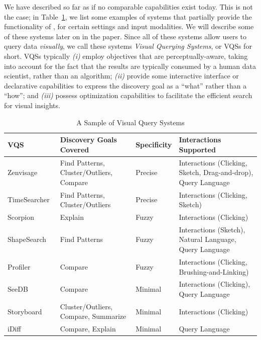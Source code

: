 \par
{}
We have described \vida so far as if no comparable capabilities
exist today.
This is not the case; in Table~\ref{fig:table}, we list some examples of systems
that partially provide the functionality of \vida,
for certain settings and input modalities.
We will describe some of these systems later on in the paper. 
Since all of these systems allow users to query data {\em visually},
we call these systems {\em Visual Querying Systems}, or VQSs for short.
VQSs typically {\em (i)} 
employ objectives that are perceptually-aware,
taking into account for the fact that the results are typically
consumed by a human data scientist, rather than an algorithm;
{\em (ii)} 
provide some interactive interface or declarative capabilities
to express the discovery goal as a ``what'' rather than a ``how'';
and
{\em (iii)}
possess optimization capabilities to facilitate
the efficient search for visual insights. 


\begin{table}[!t]
\scriptsize
\centering
\begin{tabular}{l|l|l|p{7.5cm}}
VQS & Discovery Goals Covered & Specificity & Interactions Supported \\ \hline

Zenvisage~\cite{Lee2017,Siddiqui2016} & Find Patterns, Cluster/Outliers, Compare & Precise & Interactions (Clicking, Sketch, Drag-and-drop), Query Language \\
TimeSearcher~\cite{hochheiser2004dynamic} & Find Patterns, Cluster/Outliers & Precise & Interactions (Clicking, Sketch) \\

Scorpion~\cite{Wu2013} & Explain & Fuzzy & Interactions (Clicking) \\

ShapeSearch~\cite{Siddiqui2018} & Find Patterns & Fuzzy & Interactions (Sketch), Natural Language, Query Language \\

Profiler~\cite{Kandel2012} & Compare & Fuzzy & Interactions (Clicking, Brushing-and-Linking) \\
SeeDB~\cite{Vartak2015} & Compare & Minimal & Interactions (Clicking), Query Language \\
Storyboard~\cite{Lee2018} & Cluster/Outliers, Compare, Summarize & Minimal & Interactions (Clicking) \\
iDiff~\cite{Sarawagi1998,Sarawagi2000} & Compare, Explain & Minimal & Query Language \\

\end{tabular}
\vspace{-10pt}
\caption{A Sample of Visual Query Systems}\label{fig:table}
\vspace{-10pt}
\end{table}


